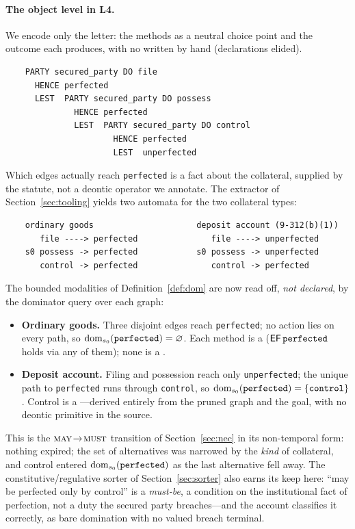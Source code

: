 \paragraph{The object level in L4.} We encode only the letter: the methods as a neutral
choice point and the outcome each produces, with no \MUST{} written by hand (declarations
elided).
\begin{verbatim}
    PARTY secured_party DO file
      HENCE perfected
      LEST  PARTY secured_party DO possess
              HENCE perfected
              LEST  PARTY secured_party DO control
                      HENCE perfected
                      LEST  unperfected
\end{verbatim}
Which edges actually reach \texttt{perfected} is a fact about the collateral, supplied by
the statute, not a deontic operator we annotate. The extractor of
Section~\ref{sec:tooling} yields two automata for the two collateral types:
\begin{verbatim}
    ordinary goods                     deposit account (9-312(b)(1))
       file ----> perfected               file ----> unperfected
    s0 possess -> perfected            s0 possess -> unperfected
       control -> perfected               control -> perfected
\end{verbatim}
The bounded modalities of Definition~\ref{def:dom} are now read off, \emph{not declared},
by the dominator query over each graph:
\begin{itemize}[noitemsep,topsep=2pt]
  \item \textbf{Ordinary goods.} Three disjoint edges reach \texttt{perfected}; no action
  lies on every path, so $\operatorname{dom}_{s_0}(\texttt{perfected})=\varnothing$. Each method is a
  \MAY{} ($\mathsf{EF}\,\texttt{perfected}$ holds via any of them); none is a \MUST{}.
  \item \textbf{Deposit account.} Filing and possession reach only \texttt{unperfected};
  the unique path to \texttt{perfected} runs through \texttt{control}, so
  $\operatorname{dom}_{s_0}(\texttt{perfected})=\{\texttt{control}\}$. Control is a \MUST{}---derived
  entirely from the pruned graph and the goal, with no deontic primitive in the source.
\end{itemize}
This is the $\textsc{may}\!\to\!\textsc{must}$ transition of Section~\ref{sec:nec} in its non-temporal
form: nothing expired; the set of alternatives was narrowed by the \emph{kind} of
collateral, and control entered $\operatorname{dom}_{s_0}(\texttt{perfected})$ as the last alternative
fell away. The constitutive/regulative sorter of Section~\ref{sec:sorter} also earns its
keep here: ``may be perfected only by control'' is a \emph{must-be}, a condition on the
institutional fact of perfection, not a duty the secured party breaches---and the account
classifies it correctly, as bare domination with no valued breach terminal.

